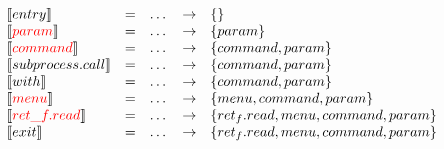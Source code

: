 \begin{frame}
  \[
\begin{array}{lclcl}
  \llbracket entry \rrbracket & = & \dots & \rightarrow & {\{\}}\\
  \llbracket {\color{red}param} \rrbracket & = & \dots & \rightarrow & \{param\} \\ 
  \llbracket {\color{red}command} \rrbracket & = & \dots & \rightarrow & \{command, param\}\\
  \llbracket subprocess.call \rrbracket & = & \dots & \rightarrow & \{command, param\}\\
  \llbracket with \rrbracket & = & \dots & \rightarrow & \{command, param\} \\
  \llbracket {\color{red}menu} \rrbracket & = & \dots & \rightarrow & \{menu, command, param\}\\
  \llbracket {\color{red}ret\_f.read} \rrbracket & = & \dots & \rightarrow & \{ret_f.read, menu, command, param\}\\
  \llbracket exit \rrbracket & = & \dots & \rightarrow & \{ret_f.read, menu, command, param\}\\
  &&&&
\end{array}
\]
\end{frame}
